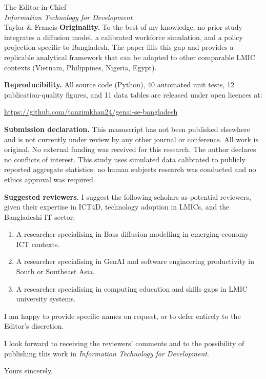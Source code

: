 \documentclass[12pt,a4paper]{letter}
\begin{document}
\begin{letter}{The Editor-in-Chief\\
               \textit{Information Technology for Development}\\
               Taylor \& Francis}
\textbf{Originality.}
To the best of my knowledge, no prior study integrates a diffusion
model, a calibrated workforce simulation, and a policy projection
specific to Bangladesh. The paper fills this gap and provides a
replicable analytical framework that can be adapted to other
comparable LMIC contexts (Vietnam, Philippines, Nigeria, Egypt).

\textbf{Reproducibility.}
All source code (Python), 40 automated unit tests, 12 publication-quality
figures, and 11 data tables are released under open licences at:
\begin{center}
\url{https://github.com/tanzimkhan24/genai-se-bangladesh}
\end{center}

\textbf{Submission declaration.}
This manuscript has not been published elsewhere and is not currently
under review by any other journal or conference. All work is original.
No external funding was received for this research. The author declares
no conflicts of interest. This study uses simulated data calibrated to
publicly reported aggregate statistics; no human subjects research was
conducted and no ethics approval was required.

\textbf{Suggested reviewers.}
I suggest the following scholars as potential reviewers, given their
expertise in ICT4D, technology adoption in LMICs, and the Bangladeshi
IT sector:
\begin{enumerate}
  \item A researcher specialising in Bass diffusion modelling in
    emerging-economy ICT contexts.
  \item A researcher specialising in GenAI and software engineering
    productivity in South or Southeast Asia.
  \item A researcher specialising in computing education and skills
    gaps in LMIC university systems.
\end{enumerate}

I am happy to provide specific names on request, or to defer entirely
to the Editor's discretion.

I look forward to receiving the reviewers' comments and to the
possibility of publishing this work in \textit{Information Technology
for Development}.

\closing{Yours sincerely,}

\end{letter}
\end{document}
